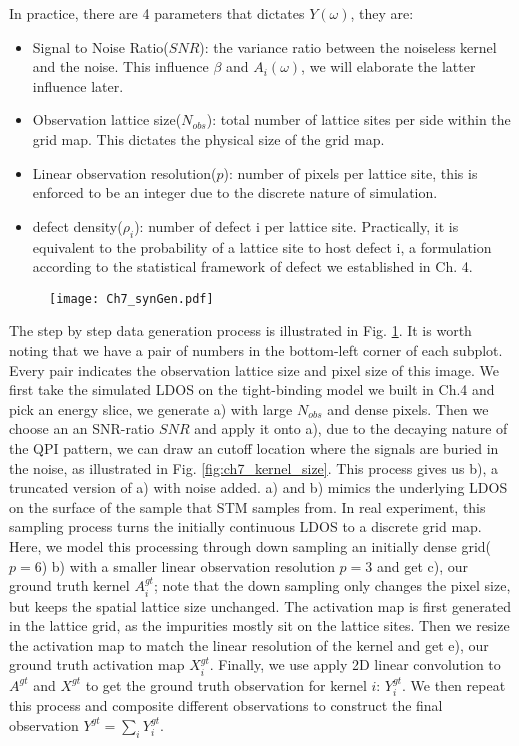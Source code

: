 In practice, there are 4 parameters that dictates $Y(\omega)$, they are:
\begin{itemize}
	\item Signal to Noise Ratio($SNR$): the variance ratio between the noiseless kernel and the noise. This influence $\beta$ and $A_i(\omega)$, we will elaborate the latter influence later. 
	\item Observation lattice size($N_{obs}$): total number of lattice sites per side within the grid map. This dictates the physical size of the grid map. 
	\item Linear observation resolution($p$): number of pixels per lattice site, this is enforced to be an integer due to the discrete nature of simulation. 
	\item defect density($\rho_i$): number of defect i per lattice site. Practically, it is equivalent to the probability of a lattice site to host defect i, a formulation according to the statistical framework of defect we established in Ch. 4.
\end{itemize}
\begin{figure}
	\texttt{[image: Ch7\_synGen.pdf]} 
	\centering
	\caption{}
	\label{fig:ch7syn}
\end{figure}

The step by step data generation process is illustrated in Fig. \ref{fig:ch7syn}. It is worth noting that we have a pair of numbers in the bottom-left corner of each subplot. Every pair indicates the observation lattice size and pixel size of this image. We first take the simulated \ac{LDOS} on the tight-binding model we built in Ch.4 and pick an energy slice, we generate a) with large $N_{obs}$ and dense pixels. Then we choose an an SNR-ratio $SNR$ and apply it onto a), due to the decaying nature of the \ac{QPI} pattern, we can draw an cutoff location where the signals are buried in the noise, as illustrated in Fig. \ref{fig:ch7_kernel_size}. This process gives us b), a truncated version of a) with noise added. a) and b) mimics the underlying \ac{LDOS} on the surface of the sample that \ac{STM} samples from. In real experiment, this sampling process turns the initially continuous \ac{LDOS} to a discrete grid map. Here, we model this processing through down sampling an initially dense grid($p=6$) b) with a smaller linear observation resolution $p=3$ and get c), our ground truth kernel $A^{gt}_i$; note that the down sampling only changes the pixel size, but keeps the spatial lattice size unchanged. The activation map is first generated in the lattice grid, as the impurities mostly sit on the lattice sites. Then we resize the activation map to match the linear resolution of the kernel and get e), our ground truth activation map $X^{gt}_i$. Finally, we use apply 2D linear convolution to $A^{gt}$ and $X^{gt}$ to get the ground truth observation for kernel $i$: $Y^{gt}_i$. We then repeat this process and composite different observations to construct the final observation $Y^{gt}= \sum_iY^{gt}_i$. 


